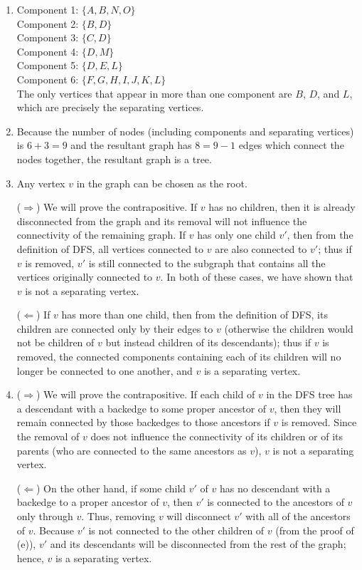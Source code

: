 \documentclass[a4paper,11pt]{article}
\begin{document}
\begin{enumerate}[label=(\alph*)]
    \item
        Component 1: $\{ A, B, N, O \}$ \\
        Component 2: $\{ B, D \}$ \\
        Component 3: $\{ C, D \}$ \\
        Component 4: $\{ D, M \}$ \\
        Component 5: $\{ D, E, L \}$ \\
        Component 6: $\{ F, G, H, I, J, K, L \}$ \\
        The only vertices that appear in more than one component are $B$, $D$, and $L$, which are precisely the separating vertices.

    \item
        Because the number of nodes (including components and separating vertices) is $6 + 3 = 9$ and the resultant graph has $8 = 9 - 1$ edges which connect the nodes together, the resultant graph is a tree.

    \item
        Any vertex $v$ in the graph can be chosen as the root. \par
        ($\Rightarrow$) We will prove the contrapositive. If $v$ has no children, then it is already disconnected from the graph and its removal will not influence the connectivity of the remaining graph. If $v$ has only one child $v'$, then from the definition of DFS, all vertices connected to $v$ are also connected to $v'$; thus if $v$ is removed, $v'$ is still connected to the subgraph that contains all the vertices originally connected to $v$. In both of these cases, we have shown that $v$ is not a separating vertex. \par
        ($\Leftarrow$) If $v$ has more than one child, then from the definition of DFS, its children are connected only by their edges to $v$ (otherwise the children would not be children of $v$ but instead children of its descendants); thus if $v$ is removed, the connected components containing each of its children will no longer be connected to one another, and $v$ is a separating vertex.

    \item
        ($\Rightarrow$) We will prove the contrapositive. If each child of $v$ in the DFS tree has a descendant with a backedge to some proper ancestor of $v$, then they will remain connected by those backedges to those ancestors if $v$ is removed. Since the removal of $v$ does not influence the connectivity of its children or of its parents (who are connected to the same ancestors as $v$), $v$ is not a separating vertex. \par
        ($\Leftarrow$) On the other hand, if some child $v'$ of $v$ has no descendant with a backedge to a proper ancestor of $v$, then $v'$ is connected to the ancestors of $v$ only through $v$. Thus, removing $v$ will disconnect $v'$ with all of the ancestors of $v$. Because $v'$ is not connected to the other children of $v$ (from the proof of (e)), $v'$ and its descendants will be disconnected from the rest of the graph; hence, $v$ is a separating vertex.


\end{enumerate}
\end{document}
